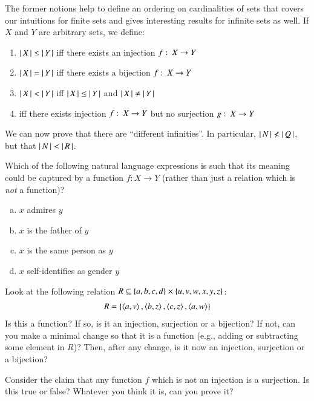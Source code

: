 \documentclass[nobib,nofonts]{tufte-handout}
\begin{document}
The former notions help to define an ordering on cardinalities of sets that covers our
intuitions for finite sets and gives interesting results for infinite sets as well. If $X$ and
$Y$ are arbitrary sets, we define:
\begin{enumerate}
\item[] $\left \lvert \, X \, \right\rvert \le \left \lvert \, Y \, \right\rvert$ iff there exists an injection $f \thinspace \colon \thinspace X \rightarrow Y$
\item[] $\left \lvert \, X \, \right\rvert =   \left \lvert \, Y \, \right\rvert$ iff there exists a  bijection $f \thinspace \colon \thinspace X \rightarrow Y$
\item[] $\left \lvert \, X \, \right\rvert <   \left \lvert \, Y \, \right\rvert$ iff $\left \lvert \, X \, \right\rvert \le \left \lvert \, Y \, \right\rvert$ and $\left \lvert \, X \, \right\rvert \neq \left \lvert \, Y \, \right\rvert$
\item[] \hspace*{1.4cm} iff there exists injection $f \thinspace \colon \thinspace X
  \rightarrow Y$ but no surjection $g \thinspace \colon \thinspace X \rightarrow Y$
\end{enumerate}
We can now prove that there are ``different infinities''. In particular,
$\left \lvert \, N \, \right\rvert \not < \left \lvert \, Q \, \right\rvert$, but that $\left \lvert \, N \, \right\rvert < \left \lvert \, R \, \right\rvert$.

\bigskip
\noindent \colorbox{mygray}{\centering
  \begin{minipage}{1.0\textwidth}

    \begin{exercise}
      Which of the following natural language expressions is such that its meaning could be
      captured by a function $f \colon X \rightarrow Y$ (rather than just a relation which is \emph{not} a function)?
      \begin{multicols}{2}
      \begin{enumerate}[a.]
        \item $x$ admires $y$
        \item $x$ is the father of $y$
        \item $x$ is the same person as $y$
        \item $x$ self-identifies as gender $y$
      \end{enumerate}
    \end{multicols}
    \end{exercise}

    \begin{exercise}
      Look at the following relation $R \subseteq \left\{a,b,c,d\right\} \times \left\{u,v,w,x,y,z\right\}$:
      \begin{align*}
        R = \left\{
        \left \langle a,v\right\rangle,
        \left \langle b,z\right\rangle,
        \left \langle c,z\right\rangle,
        \left \langle a,w\right\rangle
        \right\}
      \end{align*}
      Is this a function? If so, is it an injection, surjection or a bijection? If not, can you make a minimal change so that it is a function (e.g., adding or subtracting some element in $R$)? Then, after any change, is it now an injection, surjection or a bijection?
    \end{exercise}

    \begin{exercise}
      Consider the claim that any function $f$ which is not an injection is a surjection. Is this true or false? Whatever you think it is, can you prove it?
    \end{exercise}
  \end{minipage}
}
\end{document}
